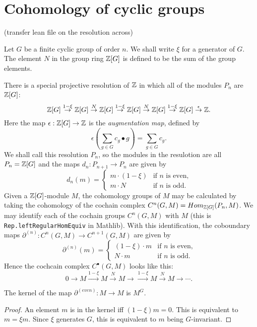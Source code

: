 \section{Cohomology of cyclic groups}

(transfer lean file on the resolution across)

Let $G$ be a finite cyclic group of order $n$. We shall write $\xi$ for a generator of $G$.
The element $N$ in the group ring ${\mathbb Z}[G]$ is defined to be the sum of the group elements.

There is a special projective resolution of ${\mathbb Z}$ in which all of the modules $P_n$ are ${\mathbb Z}[G]$:
\[
  {\mathbb Z}[G] \stackrel{1-\xi} \to {\mathbb Z}[G] \stackrel{N}\to {\mathbb Z}[G] \stackrel{1-\xi}
  \to {\mathbb Z}[G] \stackrel{N}\to {\mathbb Z}[G] \stackrel{1-\xi} \to {\mathbb Z}[G] \stackrel{\epsilon}\to {\mathbb Z}.
\]
Here the map $\epsilon : {\mathbb Z}[G] \to {\mathbb Z}$ is the \emph{augmentation map}, defined by
\[
  \epsilon \left(\sum_{g \in G} c_g \bullet g\right) = \sum_{g \in G} c_g.
\]
We shall call this resolution $P_n$, so the modules in the resulotion are all $P_n = {\mathbb Z}[G]$
and the maps $d_n : P_{n+1} \to P_n$ are given by
\[
  d_n(m) = \begin{cases}
    m \cdot (1-\xi) & \text{if $n$ is even,}\\
    m \cdot N & \text{if $n$ is odd.}
  \end{cases}
\]
Given a ${\mathbb Z}[G]$-module $M$, the cohomology groups of $M$ may be calculated by
taking the cohomology of the cochain complex $C^n(G,M) = Hom_{{\mathbb Z}[G]}(P_n,M)$.
We may identify each of the cochain groups $C^n(G,M)$ with $M$
(this is \texttt{Rep.leftRegularHomEquiv} in Mathlib).
With this identification, the coboundary maps $\partial^{(n)} : C^n(G,M) \to C^{n+1}(G,M)$
are given by
\[
  \partial^{(n)} (m) = \begin{cases}
    (1-\xi) \cdot m & \text{if $n$ is even,}\\
    N \cdot m & \text{if $n$ is odd.}
  \end{cases}
\]
Hence the cochcain complex $C^\bullet(G,M)$ looks like this:
\[
  0 \to M \stackrel{1-\xi}\to M \stackrel{N} \to M \to
    \stackrel{1-\xi}\to M \stackrel{N} \to M \to \cdots.
\]

\begin{lemma}
  The kernel of the map $\partial^{(even)}: M \to M$
  is $M^G$.
\end{lemma}

\begin{proof}
  An element $m$ is in the kernel iff $(1-\xi)m=0$.
  This is equivalent to $m=\xi m$. Since $\xi$ generates $G$, this is
  equivalent to $m$ being $G$-invariant.
\end{proof}

